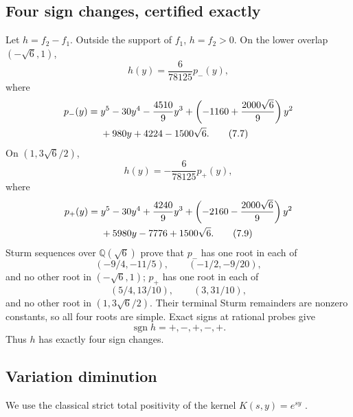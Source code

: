 \documentclass[11pt]{article}
\newcommand{\sgn}{\operatorname{sgn}}
\begin{document}
\subsection{Four sign changes, certified exactly}

Let $h=f_2-f_1$.  Outside the support of $f_1$, $h=f_2>0$.  On the lower
overlap $(-\sqrt6,1)$,
\begin{equation}
 h(y)=\frac6{78125}p_-(y),                                  \tag{7.6}
\end{equation}
where
\begin{align}
p_-(y)={}&y^5-30y^4-\frac{4510}{9}y^3
+\left(-1160+\frac{2000\sqrt6}{9}\right)y^2\notag\\
&+980y+4224-1500\sqrt6.                                   \tag{7.7}
\end{align}
On $(1,3\sqrt6/2)$,
\begin{equation}
 h(y)=-\frac6{78125}p_+(y),                                 \tag{7.8}
\end{equation}
where
\begin{align}
p_+(y)={}&y^5-30y^4+\frac{4240}{9}y^3
+\left(-2160-\frac{2000\sqrt6}{9}\right)y^2\notag\\
&+5980y-7776+1500\sqrt6.                                  \tag{7.9}
\end{align}
Sturm sequences over $\mathbb Q(\sqrt6)$ prove that $p_-$ has one root in
each of
\begin{equation}
 (-9/4,-11/5),\qquad(-1/2,-9/20),                           \tag{7.10}
\end{equation}
and no other root in $(-\sqrt6,1)$; $p_+$ has one root in each of
\begin{equation}
 (5/4,13/10),\qquad(3,31/10),                               \tag{7.11}
\end{equation}
and no other root in $(1,3\sqrt6/2)$.  Their terminal Sturm remainders are
nonzero constants, so all four roots are simple.  Exact signs at rational
probes give
\begin{equation}
 \sgn h=+,-,+,-,+.                                         \tag{7.12}
\end{equation}
Thus $h$ has exactly four sign changes.

\subsection{Variation diminution}

We use the classical strict total positivity of the kernel $K(s,y)=e^{sy}$
\cite{Karlin1968,KarlinStudden1966,Pinkus2010}.
\end{document}
